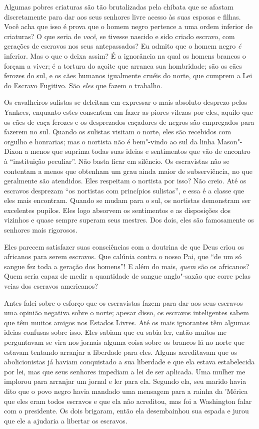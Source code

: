 Algumas pobres criaturas são tão
brutalizadas pela chibata que se afastam discretamente para dar aos seus
senhores livre acesso às suas esposas e filhas. Você acha que isso é
prova que o homem negro pertence a uma ordem inferior de criaturas? O
que seria de \emph{você}, se tivesse nascido e sido criado escravo, com
gerações de escravos nos seus antepassados?
Eu admito que o homem negro
\emph{é} inferior. Mas o que o deixa assim? É a ignorância na qual os
homens brancos o forçam a viver; é a tortura do açoite que arranca sua
hombridade; são os cães ferozes do sul, e os cães humanos igualmente
cruéis do norte, que cumprem a Lei do Escravo Fugitivo. São \emph{eles}
que fazem o trabalho.

Os cavalheiros sulistas se deleitam em
expressar o mais absoluto desprezo pelos Yankees, enquanto estes
consentem em fazer as piores vilezas por eles, aquilo que os cães de
caça ferozes e os desprezados caçadores de negros são empregados para
fazerem no sul. Quando os sulistas visitam o norte, eles são recebidos
com orgulho e honrarias; mas o nortista não é bem"-vindo ao sul da linha
Mason"-Dixon a menos que suprima todas suas ideias e sentimentos que vão
de encontro à ``instituição peculiar''. Não basta ficar em silêncio. Os
escravistas não se contentam a menos que obtenham um grau ainda maior de
subserviência, no que geralmente são atendidos. Eles respeitam o
nortista por isso? Não creio. Até os escravos desprezam ``os nortistas
com princípios sulistas'', e essa é a classe que eles mais encontram.
Quando se mudam para o sul, os nortistas demonstram ser excelentes
pupilos. Eles logo absorvem os sentimentos e as disposições dos vizinhos
e quase sempre superam seus mestres. Dos dois, eles são famosamente os
senhores mais rigorosos.

Eles parecem satisfazer suas
consciências com a doutrina de que Deus criou os africanos para serem
escravos. Que calúnia contra o nosso Pai, que ``de um só sangue fez toda
a geração dos homens''! E além do mais, \emph{quem} são os africanos?
Quem seria capaz de medir a quantidade de sangue anglo"-saxão que corre
pelas veias dos escravos americanos?

Antes falei sobre o esforço que os
escravistas fazem para dar aos seus escravos uma opinião negativa sobre
o norte; apesar disso, os escravos inteligentes sabem que têm muitos
amigos nos Estados Livres. Até os mais ignorantes têm algumas ideias
confusas sobre isso. Eles sabiam que eu sabia ler, então muitos me
perguntavam se vira nos jornais alguma coisa sobre os brancos lá no
norte que estavam tentando arranjar a liberdade para eles. Alguns
acreditavam que os abolicionistas já haviam conquistado a sua liberdade
e que ela estava estabelecida por lei, mas que seus senhores impediam a
lei de ser aplicada. Uma mulher me implorou para arranjar um jornal e
ler para ela. Segundo ela, seu marido havia dito que o povo negro havia
mandado uma mensagem para a rainha da 'Mérica que eles eram todos
escravos e que ela não acreditou, mas foi a Washington falar com o
presidente. Os dois brigaram, então ela desembainhou sua espada e jurou
que ele a ajudaria a libertar os escravos.

